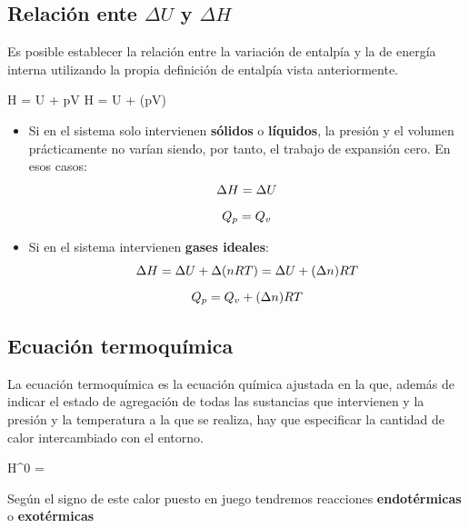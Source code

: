 \subsection{Relación ente \texorpdfstring{\(\Delta U\)}{U} y \texorpdfstring{\(\Delta H\)}{H}}\label{subsec:relacion-ente-texorpdfstring{(delta-u)}{u}-y-texorpdfstring{(delta-h)}{h}}

Es posible establecer la relación entre la variación de entalpía y la de energía interna utilizando la propia definición de entalpía vista anteriormente.
\begin{centeredequation}
    H = U + pV \Rightarrow \Delta H = \Delta U + \Delta (pV)
\end{centeredequation}

\begin{itemize}
    \item Si en el sistema solo intervienen \textbf{sólidos} o \textbf{líquidos}, la presión y el volumen prácticamente no varían siendo, por tanto, el trabajo de expansión cero.
    En esos casos:
    \begin{gather}
        \Delta H = \Delta U \notag \separ
        Q_p = Q_v
    \end{gather}
    \item Si en el sistema intervienen \textbf{gases ideales}:
    \begin{gather}
        \Delta H = \Delta U + \Delta (nRT) = \Delta U + (\Delta n)RT \notag \separ
        Q_p = Q_v + (\Delta n) R T
    \end{gather}
\end{itemize}

\subsection{Ecuación termoquímica}\label{subsec:ecuacion-termoquimica}

La ecuación termoquímica es la ecuación química ajustada en la que, además de indicar el estado de agregación de todas las sustancias que intervienen y la presión y la temperatura a la que se realiza, hay que especificar la cantidad de calor intercambiado con el entorno.
\begin{centeredequation}
    \quad  \Delta H^0 = 
\end{centeredequation}

Según el signo de este calor puesto en juego tendremos reacciones \textbf{endotérmicas} o \textbf{exotérmicas}

